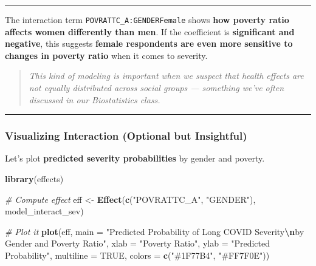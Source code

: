 \documentclass[
]{article}
\newenvironment{Shaded}{\begin{snugshade}}{\end{snugshade}}
\newcommand{\AttributeTok}[1]{\textcolor[rgb]{0.13,0.29,0.53}{#1}}
\newcommand{\CommentTok}[1]{\textcolor[rgb]{0.56,0.35,0.01}{\textit{#1}}}
\newcommand{\ConstantTok}[1]{\textcolor[rgb]{0.56,0.35,0.01}{#1}}
\newcommand{\FunctionTok}[1]{\textcolor[rgb]{0.13,0.29,0.53}{\textbf{#1}}}
\newcommand{\NormalTok}[1]{#1}
\newcommand{\OtherTok}[1]{\textcolor[rgb]{0.56,0.35,0.01}{#1}}
\newcommand{\SpecialCharTok}[1]{\textcolor[rgb]{0.81,0.36,0.00}{\textbf{#1}}}
\newcommand{\StringTok}[1]{\textcolor[rgb]{0.31,0.60,0.02}{#1}}
\begin{document}
\begin{center}\rule{0.5\linewidth}{0.5pt}\end{center}

The interaction term \texttt{POVRATTC\_A:GENDERFemale} shows \textbf{how
poverty ratio affects women differently than men}. If the coefficient is
\textbf{significant and negative}, this suggests \textbf{female
respondents are even more sensitive to changes in poverty ratio} when it
comes to severity.

\begin{quote}
\emph{This kind of modeling is important when we suspect that health
effects are not equally distributed across social groups --- something
we've often discussed in our Biostatistics class.}
\end{quote}

\begin{center}\rule{0.5\linewidth}{0.5pt}\end{center}

\subsubsection{Visualizing Interaction (Optional but
Insightful)}\label{visualizing-interaction-optional-but-insightful}

Let's plot \textbf{predicted severity probabilities} by gender and
poverty.

\begin{Shaded}
\begin{Highlighting}[]
\FunctionTok{library}\NormalTok{(effects)}

\CommentTok{\# Compute effect}
\NormalTok{eff }\OtherTok{\textless{}{-}} \FunctionTok{Effect}\NormalTok{(}\FunctionTok{c}\NormalTok{(}\StringTok{"POVRATTC\_A"}\NormalTok{, }\StringTok{"GENDER"}\NormalTok{), model\_interact\_sev)}

\CommentTok{\# Plot it}
\FunctionTok{plot}\NormalTok{(eff,}
     \AttributeTok{main =} \StringTok{"Predicted Probability of Long COVID Severity}\SpecialCharTok{\textbackslash{}n}\StringTok{by Gender and Poverty Ratio"}\NormalTok{,}
     \AttributeTok{xlab =} \StringTok{"Poverty Ratio"}\NormalTok{,}
     \AttributeTok{ylab =} \StringTok{"Predicted Probability"}\NormalTok{,}
     \AttributeTok{multiline =} \ConstantTok{TRUE}\NormalTok{,}
     \AttributeTok{colors =} \FunctionTok{c}\NormalTok{(}\StringTok{"\#1F77B4"}\NormalTok{, }\StringTok{"\#FF7F0E"}\NormalTok{))}
\end{Highlighting}
\end{Shaded}
\end{document}
